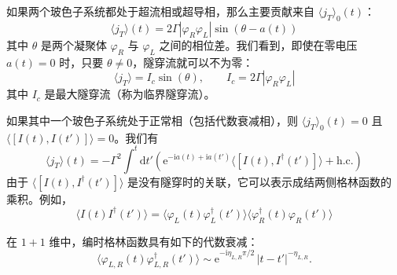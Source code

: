 如果两个玻色子系统都处于超流相或超导相，那么主要贡献来自 $\langle j_{T}\rangle_{0}(t)$：
\begin{equation*}
\langle j_{T}\rangle(t) = 2\Gamma|\varphi_{R}\varphi_{L}|\sin(\theta - a(t))
\end{equation*}
其中 $\theta$ 是两个凝聚体 $\varphi_{R}$ 与 $\varphi_{L}$ 之间的相位差。我们看到，即使在零电压 $a(t)=0$ 时，只要 $\theta\neq0$，隧穿流就可以不为零：
\begin{equation*}
\langle j_{T}\rangle = I_{c}\sin(\theta), \qquad I_{c} = 2\Gamma|\varphi_{R}\varphi_{L}|
\end{equation*}
其中 $I_{c}$ 是最大隧穿流（称为临界隧穿流）。

如果其中一个玻色子系统处于正常相（包括代数衰减相），则 $\langle j_{T}\rangle_{0}(t)=0$ 且 $\langle[I(t), I(t')]\rangle=0$。我们有
\begin{equation*}
\langle j_{T}\rangle(t) = -\Gamma^{2}\int^{t}\mathrm{d}t'\left(\mathrm{e}^{-\mathrm{i}a(t)+\mathrm{i}a(t')}\big\langle[I(t), I^{\dagger}(t')]\big\rangle + \text{h.c.}\right) \tag{3.7.15}
\end{equation*}
由于 $\big\langle[I(t), I^{\dagger}(t')]\big\rangle$ 是没有隧穿时的关联，它可以表示成结两侧格林函数的乘积。例如，
\begin{equation*}
\big\langle I(t)I^{\dagger}(t')\big\rangle = \big\langle\varphi_{L}(t)\varphi_{L}^{\dagger}(t')\big\rangle\big\langle\varphi_{R}^{\dagger}(t)\varphi_{R}(t')\big\rangle
\end{equation*}

在 $1+1$ 维中，编时格林函数具有如下的代数衰减：
\begin{equation*}
\big\langle\varphi_{L,R}(t)\varphi_{L,R}^{\dagger}(t')\big\rangle \sim \mathrm{e}^{-\mathrm{i}\eta_{L,R}\pi/2}\,|t-t'|^{-\eta_{L,R}}.
\end{equation*}

